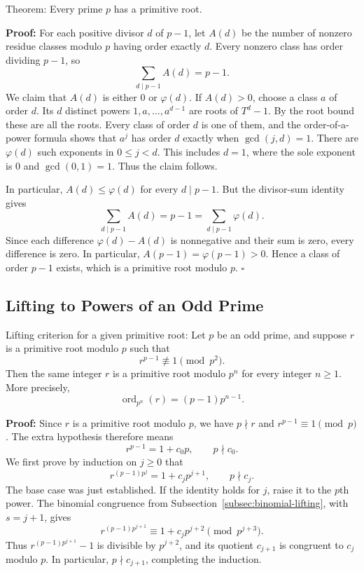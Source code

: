 \documentclass[a4paper,11pt,abstracton]{scrartcl}
\theoremstyle{dotlessP}
\theoremstyle{dotlessS}
\theoremstyle{remark}
\theoremstyle{definition}
\begin{document}
\begin{mainbox}{Theorem:}
Every prime $p$ has a primitive root.
\end{mainbox}

\textbf{Proof:}
For each positive divisor $d$ of $p-1$, let $A(d)$ be the number of
nonzero residue classes modulo $p$ having order exactly $d$.
Every nonzero class has order dividing $p-1$, so
\[
    \sum_{d\mid p-1}A(d)=p-1.
\]
We claim that $A(d)$ is either $0$ or $\varphi(d)$.
If $A(d)>0$, choose a class $a$ of order $d$.
Its $d$ distinct powers $1,a,\ldots,a^{d-1}$ are roots of $T^d-1$.
By the root bound these are all the roots.
Every class of order $d$ is one of them, and the order-of-a-power formula
shows that $a^j$ has order $d$ exactly when $\gcd(j,d)=1$.
There are $\varphi(d)$ such exponents in $0\leq j<d$.
This includes $d=1$, where the sole exponent is $0$ and
$\gcd(0,1)=1$. Thus the claim follows.

In particular, $A(d)\leq\varphi(d)$ for every $d\mid p-1$.
But the divisor-sum identity gives
\[
    \sum_{d\mid p-1}A(d)=p-1=\sum_{d\mid p-1}\varphi(d).
\]
Since each difference $\varphi(d)-A(d)$ is nonnegative and their
sum is zero, every difference is zero. In particular,
$A(p-1)=\varphi(p-1)>0$. Hence a class of order $p-1$ exists,
which is a primitive root modulo $p$.
\hfill$\square$


\subsection{Lifting to Powers of an Odd Prime}

\begin{mainbox}{Lifting criterion for a given primitive root:}
Let $p$ be an odd prime, and suppose $r$ is a primitive root modulo $p$
such that
\[
    r^{p-1}\not\equiv1\pmod{p^2}.
\]
Then the same integer $r$ is a primitive root modulo $p^n$ for every
integer $n\geq1$. More precisely,
\[
    \boxed{\operatorname{ord}_{p^n}(r)=(p-1)p^{n-1}.}
\]
\end{mainbox}

\textbf{Proof:}
Since $r$ is a primitive root modulo $p$, we have $p\nmid r$ and
$r^{p-1}\equiv1\pmod p$. The extra hypothesis therefore means
\[
    r^{p-1}=1+c_0p,\qquad p\nmid c_0.
\]
We first prove by induction on $j\geq0$ that
\[
    r^{(p-1)p^j}=1+c_jp^{j+1},\qquad p\nmid c_j.
\]
The base case was just established. If the identity holds for $j$,
raise it to the $p$th power. The binomial congruence from
Subsection~\ref{subsec:binomial-lifting}, with $s=j+1$, gives
\[
    r^{(p-1)p^{j+1}}
    \equiv1+c_jp^{j+2}\pmod{p^{j+3}}.
\]
Thus $r^{(p-1)p^{j+1}}-1$ is divisible by $p^{j+2}$, and its quotient
$c_{j+1}$ is congruent to $c_j$ modulo $p$. In particular,
$p\nmid c_{j+1}$, completing the induction.
\end{document}
